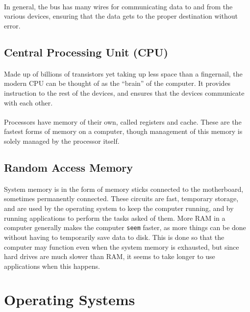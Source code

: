 \documentclass[letter,11pt]{article}
\begin{document}
\paragraph{}In general, the bus has many wires for communicating data to and from the various devices, ensuring that the data gets to the proper destination without error.

\subsection{Central Processing Unit (CPU)}
\paragraph{}Made up of billions of transistors yet taking up less space than a fingernail, the modern CPU can be thought of as the ``brain'' of the computer. It provides instruction to the rest of the devices, and ensures that the devices communicate with each other.

\paragraph{}Processors have memory of their own, called registers and cache. These are the fastest forms of memory on a computer, though management of this memory is solely managed by the processor itself.

\subsection{Random Access Memory}\label{sec:ram}
\paragraph{}System memory is in the form of memory sticks connected to the motherboard, sometimes permanently connected. These circuits are fast, temporary storage, and are used by the operating system to keep the computer running, and by running applications to perform the tasks asked of them. More RAM in a computer generally makes the computer \texttt{seem} faster, as more things can be done without having to temporarily save data to disk. This is done so that the computer may function even when the system memory is exhausted, but since hard drives are much slower than RAM, it seems to take longer to use applications when this happens.

\section{Operating Systems}
\end{document}
